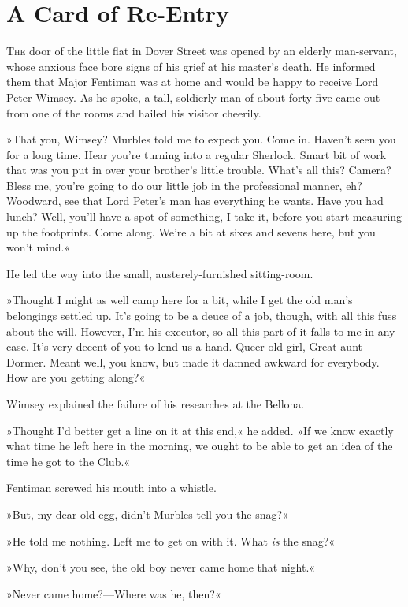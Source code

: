 \chapter{A Card of Re-Entry}
\lettrine[lines=4]{T}{he} door of the little flat in Dover Street was opened by an elderly man-servant, whose anxious face bore signs of his grief at his master's death. He informed them that Major Fentiman was at home and would be happy to receive Lord Peter Wimsey. As he spoke, a tall, soldierly man of about forty-five came out from one of the rooms and hailed his visitor cheerily.

»That you, Wimsey? Murbles told me to expect you. Come in. Haven't seen you for a long time. Hear you're turning into a regular Sherlock. Smart bit of work that was you put in over your brother's little trouble. What's all this? Camera? Bless me, you're going to do our little job in the professional manner, eh? Woodward, see that Lord Peter's man has everything he wants. Have you had lunch? Well, you'll have a spot of something, I take it, before you start measuring up the footprints. Come along. We're a bit at sixes and sevens here, but you won't mind.«

He led the way into the small, austerely-furnished sitting-room.

»Thought I might as well camp here for a bit, while I get the old man's belongings settled up. It's going to be a deuce of a job, though, with all this fuss about the will. However, I'm his executor, so all this part of it falls to me in any case. It's very decent of you to lend us a hand. Queer old girl, Great-aunt Dormer. Meant well, you know, but made it damned awkward for everybody. How are you getting along?«

Wimsey explained the failure of his researches at the Bellona.

»Thought I'd better get a line on it at this end,« he added. »If we know exactly what time he left here in the morning, we ought to be able to get an idea of the time he got to the Club.«

Fentiman screwed his mouth into a whistle.

»But, my dear old egg, didn't Murbles tell you the snag?«

»He told me nothing. Left me to get on with it. What \textit{is} the snag?«

»Why, don't you see, the old boy never came home that night.«

»Never came home?—Where was he, then?«

